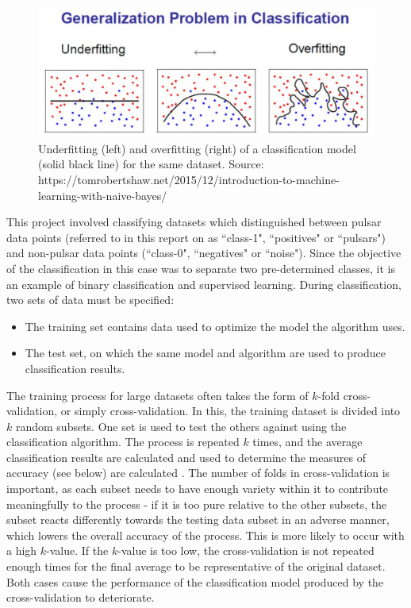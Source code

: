 \documentclass[12pt]{article}
\begin{document}
\begin{figure}[h!]
\begin{center}
\includegraphics[scale=0.3]{overfitting.jpg}
\caption{Underfitting (left) and overfitting (right) of a classification model (solid black line) for the same dataset. Source: https://tomrobertshaw.net/2015/12/introduction-to-machine-learning-with-naive-bayes/}
\label{fitting}
\end{center}
\end{figure}

This project involved classifying datasets which distinguished between pulsar data points (referred to in this report on as ``class-1", ``positives" or ``pulsars") and non-pulsar data points (``class-0", ``negatives" or ``noise"). Since the objective of the classification in this case was to separate two pre-determined classes, it is an example of binary classification and supervised learning. During classification, two sets of data must be specified:
\begin{itemize}
\item The training set contains data used to optimize the model the algorithm uses.
\item The test set, on which the same model and algorithm are used to produce classification results.
\end{itemize}

The training process for large datasets often takes the form of $k$-fold cross-validation, or simply cross-validation. In this, the training dataset is divided into $k$ random subsets. One set is used to test the others against using the classification algorithm. The process is repeated $k$ times, and the average classification results are calculated and used to determine the measures of accuracy (see below) are calculated \cite{kohavi1995study}. The number of folds in cross-validation is important, as each subset needs to have enough variety within it to contribute meaningfully to the process - if it is too pure relative to the other subsets, the subset reacts differently towards the testing data subset in an adverse manner, which lowers the overall accuracy of the process. This is more likely to occur with a high $k$-value. If the $k$-value is too low, the cross-validation is not repeated enough times for the final average to be representative of the original dataset. Both cases cause the performance of the classification model produced by the cross-validation to deteriorate.
\end{document}
